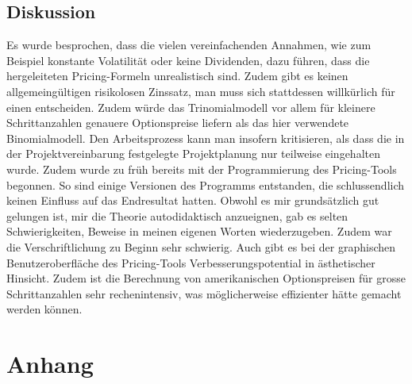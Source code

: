 \documentclass[11pt]{report} %
\begin{document}
\section{Diskussion}
Es wurde besprochen, dass die vielen vereinfachenden Annahmen, wie zum Beispiel konstante Volatilität oder keine Dividenden, dazu führen, dass die hergeleiteten Pricing-Formeln unrealistisch sind. Zudem gibt es keinen allgemeingültigen risikolosen Zinssatz, man muss sich stattdessen willkürlich für einen entscheiden. Zudem würde das Trinomialmodell vor allem für kleinere Schrittanzahlen genauere Optionspreise liefern als das hier verwendete Binomialmodell. Den Arbeitsprozess kann man insofern kritisieren, als dass die in der Projektvereinbarung festgelegte Projektplanung nur teilweise eingehalten wurde. Zudem wurde zu früh bereits mit der Programmierung des Pricing-Tools begonnen. So sind einige Versionen des Programms entstanden, die schlussendlich keinen Einfluss auf das Endresultat hatten. Obwohl es mir grundsätzlich gut gelungen ist, mir die Theorie autodidaktisch anzueignen, gab es selten Schwierigkeiten, Beweise in meinen eigenen Worten wiederzugeben. Zudem war die Verschriftlichung zu Beginn sehr schwierig. Auch gibt es bei der graphischen Benutzeroberfläche des Pricing-Tools Verbesserungspotential in ästhetischer Hinsicht. Zudem ist die Berechnung von amerikanischen Optionspreisen für grosse Schrittanzahlen sehr rechenintensiv, was möglicherweise effizienter hätte gemacht werden können. 

\renewcommand\bibname{Literaturverzeichnis}
\addtocounter{chapter}{1}
\setcounter{section}{0}
\addtocounter{section}{1}
\printbibliography
\addtocounter{section}{1}
\listoffigures

\chapter{Anhang}
\end{document}
